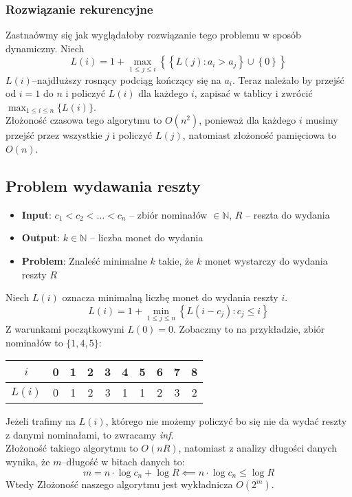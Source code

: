 \documentclass[11pt,a4paper]{article}
\begin{document}
\subsubsection*{Rozwiązanie rekurencyjne}
Zastnaówmy się jak wyglądałoby rozwiązanie tego problemu w sposób dynamiczny. Niech
\[
    L(i) = 1 + \max_{1\leq j\leq i}\left\{\left\{L(j): a_i > a_j\right\}\cup\left\{0\right\}\right\}
\]
$L(i)$--najdłuższy rosnący podciąg kończący się na $a_i$. Teraz należało by przejść od $i=1$ do $n$ i policzyć $L(i)$ dla każdego $i$, zapisać w tablicy i zwrócić $\max_{1\leq i \leq n}\{L(i)\}$.\\
Złożoność czasowa tego algorytmu to $O(n^2)$, ponieważ dla każdego $i$ musimy przejść przez wszystkie $j$ i policzyć $L(j)$, natomiast złożoność pamięciowa to $O(n)$.
\subsection{Problem wydawania reszty}
\begin{itemize}
    \item \textbf{Input}: $c_1 < c_2 < \dots < c_n$ -- zbiór nominałów $\in \mathbb{N}$, $R$ -- reszta do wydania
    \item \textbf{Output}: $k \in \mathbb{N}$ -- liczba monet do wydania
    \item \textbf{Problem}: Znaleść minimalne $k$ takie, że $k$ monet wystarczy do wydania reszty $R$
\end{itemize}
Niech $L(i)$ oznacza minimalną liczbę monet do wydania reszty $i$.
\[
    L(i)=1+\min_{1\leq j\leq n}\left\{L(i-c_j): c_j\leq i\right\}
\]
Z warunkami początkowymi $L(0)=0$. Zobaczmy to na przykładzie, zbiór nominałów to $\{1,4,5\}$:
\begin{center}
    \begin{tabular}{|c|c|c|c|c|c|c|c|c|c|}
        \hline
        $i$  & 0 & 1 & 2 & 3 & 4 & 5 & 6 & 7 & 8 \\
        \hline
        $L(i)$  & 0 & 1 & 2 & 3 & 1 & 1 & 2 & 3 & 2 \\
        \hline
    \end{tabular}
\end{center}
Jeżeli trafimy na $L(i)$, którego nie możemy policzyć bo się nie da wydać reszty z danymi nominałami, to zwracamy \textit{inf}.\\
Złożoność takiego algorytmu to $O(nR)$, natomiast z analizy długości danych wynika, że $m$--długość w bitach danych to:
\[
    m=n\cdot \log c_n + \log R \impliedby n \cdot \log c_n \leq \log R
\]
Wtedy Złożoność naszego algorytmu jest wykładnicza $O(2^m)$.
\end{document}
